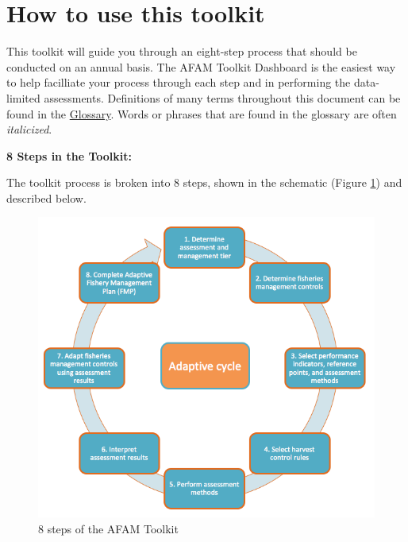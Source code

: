 \documentclass[]{book}
\begin{document}
\section{How to use this toolkit}\label{how-to-use-this-toolkit}

This toolkit will guide you through an eight-step process that should be
conducted on an annual basis. The AFAM Toolkit Dashboard is the easiest
way to help facilliate your process through each step and in performing
the data-limited assessments. Definitions of many terms throughout this
document can be found in the \protect\hyperlink{Glossary}{Glossary}.
Words or phrases that are found in the glossary are often
\emph{italicized}.

\textbf{8 Steps in the Toolkit:}

The toolkit process is broken into 8 steps, shown in the schematic
(Figure \protect\hyperlink{fig:schematic}{\ref{fig:schematic}}) and
described below.

\begin{figure}
\centering
\includegraphics{myMediaFolder/media/2_image1.png}
\caption{\label{fig:schematic}8 steps of the AFAM Toolkit}
\end{figure}
\end{document}
